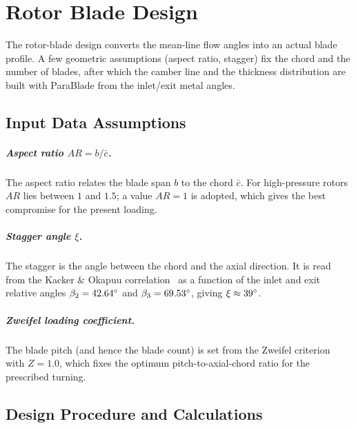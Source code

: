 \chapter{Rotor Blade Design}

The rotor-blade design converts the mean-line flow angles into an actual blade
profile. A few geometric assumptions (aspect ratio, stagger) fix the chord and
the number of blades, after which the camber line and the thickness distribution
are built with ParaBlade from the inlet/exit metal angles.

\section{Input Data Assumptions}

\paragraph{Aspect ratio $AR = b/\bar c$.}
The aspect ratio relates the blade span $b$ to the chord $\bar c$. For
high-pressure rotors $AR$ lies between $1$ and $1.5$; a value $AR = 1$ is adopted,
which gives the best compromise for the present loading.

\paragraph{Stagger angle $\xi$.}
The stagger is the angle between the chord and the axial direction. It is read
from the Kacker \& Okapuu correlation~\cite{kacker} as a function of the inlet and
exit relative angles $\beta_2 = 42.64^\circ$ and $\beta_3 = 69.53^\circ$, giving
$\xi \approx 39^\circ$.

\paragraph{Zweifel loading coefficient.}
The blade pitch (and hence the blade count) is set from the Zweifel
criterion~\cite{zweifel} with $Z = 1.0$, which fixes the optimum
pitch-to-axial-chord ratio for the prescribed turning.

\section{Design Procedure and Calculations}

